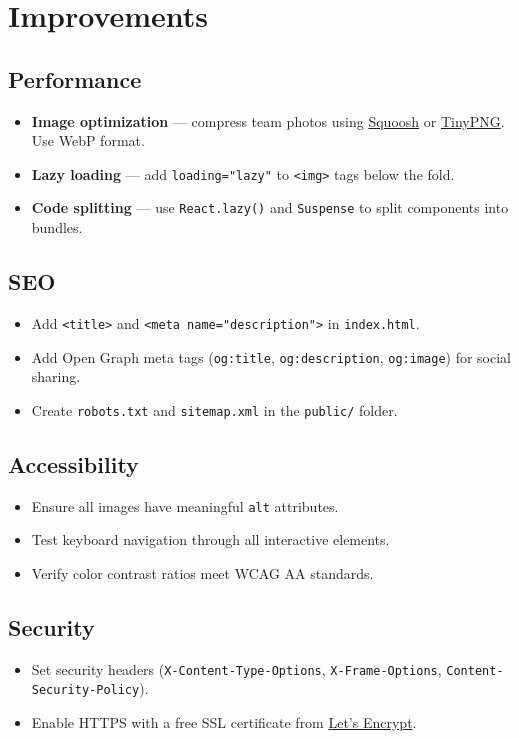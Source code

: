 \documentclass[11pt,a4paper]{article}
\begin{document}
\section{Improvements}

\subsection{Performance}
\begin{itemize}[leftmargin=*, label=\textcolor{accent}{$\bullet$}]
    \item \textbf{Image optimization} --- compress team photos using
          \href{https://squoosh.app}{Squoosh} or
          \href{https://tinypng.com}{TinyPNG}.  Use WebP format.
    \item \textbf{Lazy loading} --- add \texttt{loading="lazy"} to
          \texttt{<img>} tags below the fold.
    \item \textbf{Code splitting} --- use \texttt{React.lazy()} and
          \texttt{Suspense} to split components into bundles.
\end{itemize}

\subsection{SEO}
\begin{itemize}[leftmargin=*, label=\textcolor{accent}{$\bullet$}]
    \item Add \texttt{<title>} and \texttt{<meta name="description">}
          in \texttt{index.html}.
    \item Add Open Graph meta tags (\texttt{og:title}, \texttt{og:description},
          \texttt{og:image}) for social sharing.
    \item Create \texttt{robots.txt} and \texttt{sitemap.xml} in
          the \texttt{public/} folder.
\end{itemize}

\subsection{Accessibility}
\begin{itemize}[leftmargin=*, label=\textcolor{accent}{$\bullet$}]
    \item Ensure all images have meaningful \texttt{alt} attributes.
    \item Test keyboard navigation through all interactive elements.
    \item Verify color contrast ratios meet WCAG AA standards.
\end{itemize}

\subsection{Security}
\begin{itemize}[leftmargin=*, label=\textcolor{accent}{$\bullet$}]
    \item Set security headers (\texttt{X-Content-Type-Options},
          \texttt{X-Frame-Options}, \texttt{Content-Security-Policy}).
    \item Enable HTTPS with a free SSL certificate from
          \href{https://letsencrypt.org}{Let's Encrypt}.
\end{itemize}
\end{document}
